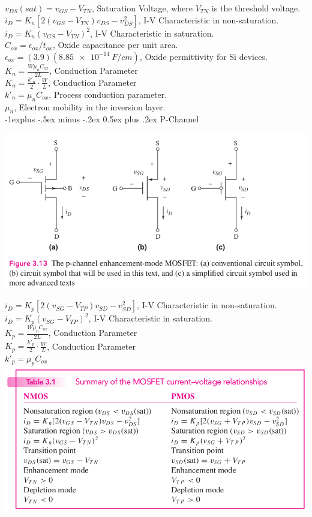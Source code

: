 \documentclass[10pt,landscape]{article}
\makeatletter
\renewcommand{\subsection}{\@startsection{subsection}{2}{0mm}%
                                {-1explus -.5ex minus -.2ex}%
                                {0.5ex plus .2ex}%
                                {\normalfont\normalsize\bfseries}}
\makeatother
\begin{document}
\begin{multicols}{3}
$v_{DS}(sat) = v_{GS} - V_{TN}$, Saturation Voltage, where $V_{TN}$ is the threshold voltage.\\
$i_D = K_n \left[2(v_{GS} - V_{TN} ) v_{DS} - v_{DS}^2\right]$, I-V Characteristic in non-saturation.\\
$i_D = K_n (v_{GS} - V_{TN})^2$, I-V Characteristic in saturation.\\
$C_{ox} = \epsilon_{ox} / t_{ox}$, Oxide capacitance per unit area.\\
$\epsilon_{ox} = (3.9)(\SI{8.85e-14}{F/cm})$, Oxide permittivity for Si devices.\\
$K_n = \frac{W \mu_n C_{ox}}{2L}$, Conduction Parameter\\
$K_n = \frac{k'_n}{2} \cdot \frac{W}{L}$, Conduction Parameter\\
$k'_n = \mu_nC_{ox}$, Process conduction parameter.\\
$\mu_n$, Electron mobility in the inversion layer.\\

\subsection{P-Channel}

\includegraphics[width = \linewidth]{./img/f3.13.png}

$i_D = K_p \left[2(v_{SG} - V_{TP} ) v_{SD} - v_{SD}^2\right]$, I-V Characteristic in non-saturation.\\
$i_D = K_p (v_{SG} - V_{TP})^2$, I-V Characteristic in saturation.\\
$K_p = \frac{W \mu_p C_{ox}}{2L}$, Conduction Parameter\\
$K_p = \frac{k'_p}{2} \cdot \frac{W}{L}$, Conduction Parameter\\
$k'_p = \mu_p C_{ox}$\\

\includegraphics[width = \linewidth]{./img/t3.1.png}


\end{multicols}
\end{document}
